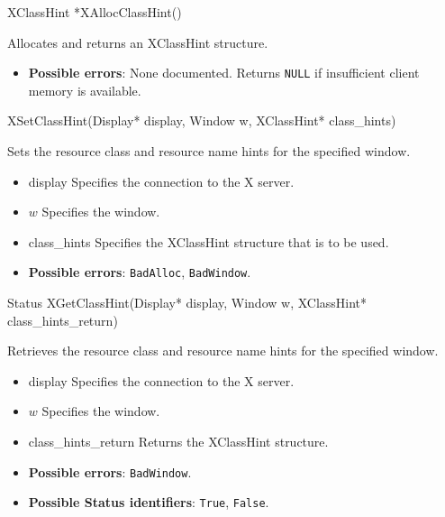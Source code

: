 \documentclass{report}
\begin{document}
\begin{itemize}
            \begin{cppcode}
            XClassHint *XAllocClassHint()
            \end{cppcode}
            \bigbreak \noindent
            Allocates and returns an XClassHint structure.
            \begin{itemize}
                \item \textbf{Possible errors}: None documented. Returns \texttt{NULL} if insufficient client memory is available.
            \end{itemize}

            \begin{cppcode}
            XSetClassHint(Display* display, Window w, XClassHint* class_hints)
            \end{cppcode}
            \bigbreak \noindent
            Sets the resource class and resource name hints for the specified window.
            \begin{itemize}
                \item display Specifies the connection to the X server.
                \item $w$ Specifies the window.
                \item class\_hints Specifies the XClassHint structure that is to be used.
            \end{itemize}
            \begin{itemize}
                \item \textbf{Possible errors}: \texttt{BadAlloc}, \texttt{BadWindow}.
            \end{itemize}

            \begin{cppcode}
            Status XGetClassHint(Display* display, Window w, XClassHint* class_hints_return)
            \end{cppcode}
            \bigbreak \noindent
            Retrieves the resource class and resource name hints for the specified window.
            \begin{itemize}
                \item display Specifies the connection to the X server.
                \item $w$ Specifies the window.
                \item class\_hints\_return Returns the XClassHint structure.
            \end{itemize}
            \begin{itemize}
                \item \textbf{Possible errors}: \texttt{BadWindow}.
                \item \textbf{Possible Status identifiers}: \texttt{True}, \texttt{False}.
            \end{itemize}


\end{itemize}
\end{document}
